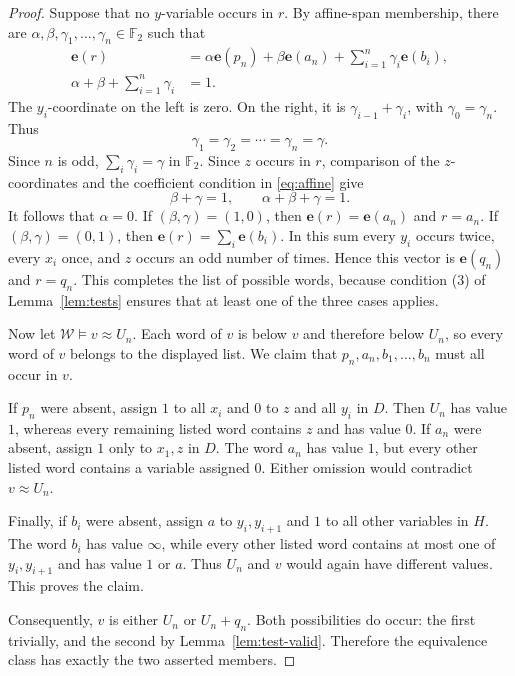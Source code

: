 \documentclass[10pt,a4paper]{amsart}
\newcommand{\F}{\mathbb F_2}
\newcommand{\W}{\mathcal W}
\newcommand{\eqid}{\approx}
\newcommand{\ivec}[1]{\mathbf e(#1)}
\begin{document}
\begin{proof}
Suppose that no $y$-variable occurs in $r$. By affine-span
membership, there are $\alpha,\beta,\gamma_1,\ldots,\gamma_n\in\F$
such that
\begin{equation}\label{eq:affine}
\begin{aligned}
\ivec{r}
 &=\alpha\ivec{p_n}+\beta\ivec{a_n}
       +\sum_{i=1}^{n}\gamma_i\ivec{b_i},\\
\alpha+\beta+\sum_{i=1}^{n}\gamma_i&=1.
\end{aligned}
\end{equation}
The $y_i$-coordinate on the left is zero. On the right, it is
$\gamma_{i-1}+\gamma_i$, with $\gamma_0=\gamma_n$.
Thus
\[
\gamma_1=\gamma_2=\cdots=\gamma_n=\gamma.
\]
Since $n$ is odd, $\sum_i\gamma_i=\gamma$ in $\F$.
Since $z$ occurs in $r$, comparison of the $z$-coordinates
and the coefficient condition in \eqref{eq:affine} give
\[
\beta+\gamma=1,\qquad \alpha+\beta+\gamma=1.
\]
It follows that $\alpha=0$. If $(\beta,\gamma)=(1,0)$,
then $\ivec{r}=\ivec{a_n}$ and $r=a_n$.
If $(\beta,\gamma)=(0,1)$, then
$\ivec{r}=\sum_i\ivec{b_i}$.
In this sum every $y_i$ occurs twice, every $x_i$ once, and
$z$ occurs an odd number of times. Hence this vector is
$\ivec{q_n}$ and $r=q_n$. This completes the list of possible
words, because condition (3) of Lemma~\ref{lem:tests} ensures
that at least one of the three cases applies.

Now let $\W\models v\eqid U_n$. Each word of $v$ is below
$v$ and therefore below $U_n$, so every word of $v$ belongs
to the displayed list. We claim that $p_n,a_n,b_1,\ldots,b_n$
must all occur in $v$.

If $p_n$ were absent, assign $1$ to all $x_i$ and $0$ to
$z$ and all $y_i$ in $D$. Then $U_n$ has value $1$,
whereas every remaining listed word contains $z$ and has value
$0$. If $a_n$ were absent, assign $1$ only to $x_1,z$ in
$D$. The word $a_n$ has value $1$, but every other listed
word contains a variable assigned $0$. Either omission would
contradict $v\eqid U_n$.

Finally, if $b_i$ were absent, assign $a$ to
$y_i,y_{i+1}$ and $1$ to all other variables in $H$.
The word $b_i$ has value $\infty$, while every other listed
word contains at most one of $y_i,y_{i+1}$ and has value
$1$ or $a$. Thus $U_n$ and $v$ would again have different
values. This proves the claim.

Consequently, $v$ is either $U_n$ or $U_n+q_n$.
Both possibilities do occur: the first trivially, and the
second by Lemma~\ref{lem:test-valid}. Therefore the equivalence class has
exactly the two asserted members.
\end{proof}
\end{document}
